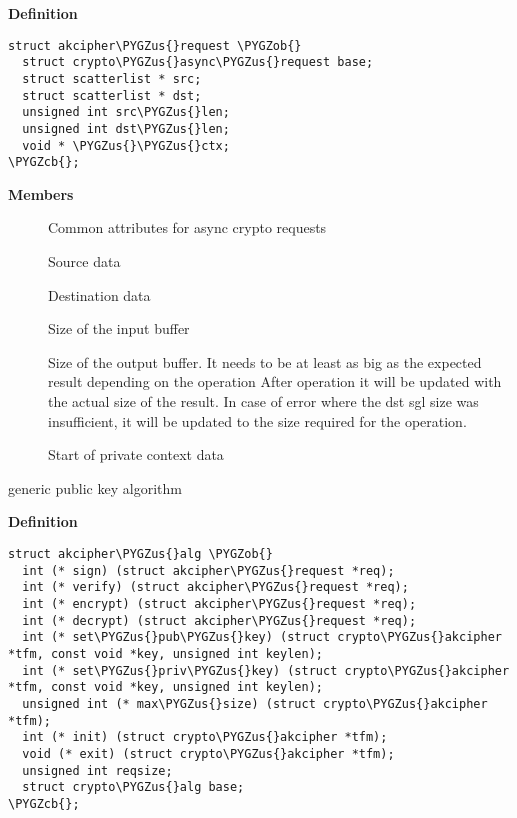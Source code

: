 \documentclass[a4paper,8pt,english]{sphinxmanual}
\def\PYGZus{\char`\_}
\def\PYGZob{\char`\{}
\def\PYGZcb{\char`\}}
\begin{document}
\textbf{Definition}

\begin{Verbatim}[commandchars=\\\{\}]
struct akcipher\PYGZus{}request \PYGZob{}
  struct crypto\PYGZus{}async\PYGZus{}request base;
  struct scatterlist * src;
  struct scatterlist * dst;
  unsigned int src\PYGZus{}len;
  unsigned int dst\PYGZus{}len;
  void * \PYGZus{}\PYGZus{}ctx;
\PYGZcb{};
\end{Verbatim}

\textbf{Members}
\begin{description}
\item[{}] \leavevmode
Common attributes for async crypto requests

\item[{}] \leavevmode
Source data

\item[{}] \leavevmode
Destination data

\item[{}] \leavevmode
Size of the input buffer

\item[{}] \leavevmode
Size of the output buffer. It needs to be at least
as big as the expected result depending       on the operation
After operation it will be updated with the actual size of the
result.
In case of error where the dst sgl size was insufficient,
it will be updated to the size required for the operation.

\item[{}] \leavevmode
Start of private context data

\end{description}

\begin{fulllineitems}
\label{crypto/api-akcipher:c.akcipher_alg}
generic public key algorithm

\end{fulllineitems}


\textbf{Definition}

\begin{Verbatim}[commandchars=\\\{\}]
struct akcipher\PYGZus{}alg \PYGZob{}
  int (* sign) (struct akcipher\PYGZus{}request *req);
  int (* verify) (struct akcipher\PYGZus{}request *req);
  int (* encrypt) (struct akcipher\PYGZus{}request *req);
  int (* decrypt) (struct akcipher\PYGZus{}request *req);
  int (* set\PYGZus{}pub\PYGZus{}key) (struct crypto\PYGZus{}akcipher *tfm, const void *key, unsigned int keylen);
  int (* set\PYGZus{}priv\PYGZus{}key) (struct crypto\PYGZus{}akcipher *tfm, const void *key, unsigned int keylen);
  unsigned int (* max\PYGZus{}size) (struct crypto\PYGZus{}akcipher *tfm);
  int (* init) (struct crypto\PYGZus{}akcipher *tfm);
  void (* exit) (struct crypto\PYGZus{}akcipher *tfm);
  unsigned int reqsize;
  struct crypto\PYGZus{}alg base;
\PYGZcb{};
\end{Verbatim}
\end{document}
